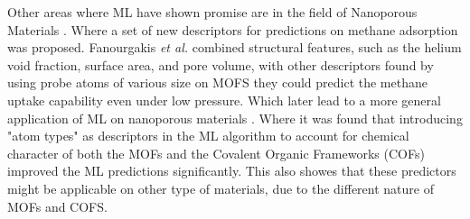 Other areas where ML have shown promise are in the field of Nanoporous Materials \cite{fanourgakis2019robust}. Where a set of new descriptors for predictions on methane adsorption was proposed. Fanourgakis \textit{et al.} combined structural features, such as the helium void fraction, surface area, and pore volume, with other descriptors found by using probe atoms of various size on MOFS they could predict the methane uptake capability even under low pressure. Which later lead to a more general application of ML on nanoporous materials \cite{fanourgakis2020universal}. Where it was found that introducing "atom types" as descriptors in the ML algorithm to account for chemical character of both the MOFs and the Covalent Organic Frameworks (COFs) improved the ML predictions significantly. This also showes that these predictors might be applicable on other type of materials, due to the different nature of MOFs and COFS. 
